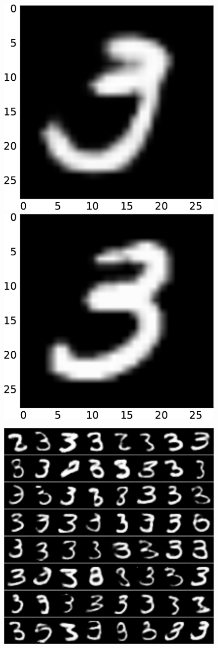 \documentclass[xcolor={usenames,dvipsnames,svgnames}, compress]{beamer}
\begin{document}
\begin{frame}[t]
\begin{figure}[t]
    \begin{minipage}{0.2\linewidth}
\vspace{-13pt}
    \includegraphics[width=0.47\linewidth]{figures/mpe-12}\\
    \includegraphics[width=0.47\linewidth]{figures/nn-sample-12}
\end{minipage}\hspace{-30pt}\begin{minipage}{0.18\linewidth}
    \includegraphics[width=1.0\columnwidth]{figures/cond-samples-12}\\

\end{minipage}
\end{figure}
\end{frame}
\end{document}
